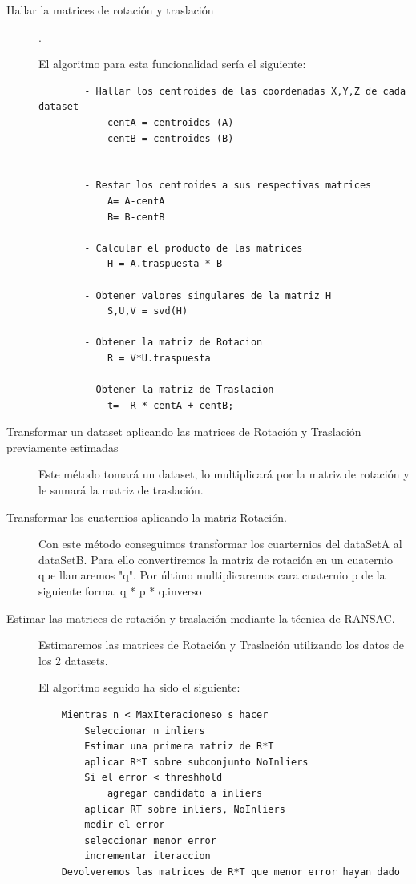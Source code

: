 \begin{description}
	\item [Hallar la matrices de rotación y traslación] .

		El algoritmo para esta funcionalidad sería el siguiente:
        \begin{lstlisting}
        - Hallar los centroides de las coordenadas X,Y,Z de cada dataset
        	centA = centroides (A)
        	centB = centroides (B)
        

        - Restar los centroides a sus respectivas matrices
          	A= A-centA
          	B= B-centB
        
        - Calcular el producto de las matrices
        	H = A.traspuesta * B

        - Obtener valores singulares de la matriz H
        	S,U,V = svd(H)
        
        - Obtener la matriz de Rotacion
          	R = V*U.traspuesta

        - Obtener la matriz de Traslacion
        	t= -R * centA + centB;  
        \end{lstlisting}

	\item[Transformar un dataset aplicando las matrices de Rotación y Traslación previamente estimadas]

		Este método tomará un dataset, lo multiplicará por la matriz de rotación y le sumará la matriz de traslación.

	\item[Transformar los cuaternios aplicando la matriz Rotación.]

		Con este método conseguimos transformar los cuarternios del dataSetA al dataSetB.
		Para ello convertiremos la matriz de rotación en un cuaternio que llamaremos "q".
		Por último multiplicaremos cara cuaternio p de la siguiente forma.
		  q * p * q.inverso 

	\item[Estimar las matrices de rotación y traslación mediante la técnica de RANSAC.]

		Estimaremos las matrices de Rotación y Traslación utilizando los datos de los 2 datasets.

	El algoritmo seguido ha sido el siguiente:
    \begin{lstlisting}
	Mientras n < MaxIteracioneso s hacer
		Seleccionar n inliers
		Estimar una primera matriz de R*T
		aplicar R*T sobre subconjunto NoInliers
		Si el error < threshhold
			agregar candidato a inliers
		aplicar RT sobre inliers, NoInliers
		medir el error 
		seleccionar menor error
		incrementar iteraccion
	Devolveremos las matrices de R*T que menor error hayan dado
	\end{lstlisting}
	        

    \end{description}


